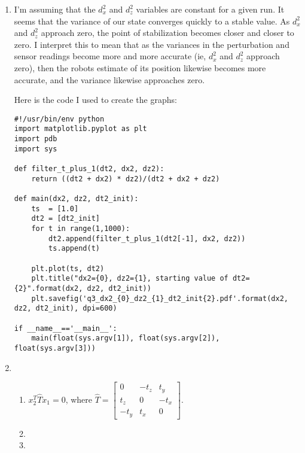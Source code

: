 \documentclass[letter,8pt]{article}
\begin{document}
\begin{enumerate}
\item I'm assuming that the $d_x^2$ and $d_z^2$ variables are constant for a given run.
  It seems that the variance of our state converges quickly to a stable value. As $d_x^2$ and $d_z^2$
  approach zero, the point of stabilization becomes closer and closer to zero. I interpret this to mean
  that as the variances in the perturbation and sensor readings become more and more accurate (ie, $d_x^2$ and $d_z^2$ approach zero),
  then the robots estimate of its position likewise becomes more accurate, and the variance likewise approaches zero.

  Here is the code I used to create the graphs:
  \begin{verbatim}
#!/usr/bin/env python
import matplotlib.pyplot as plt
import pdb
import sys

def filter_t_plus_1(dt2, dx2, dz2):
    return ((dt2 + dx2) * dz2)/(dt2 + dx2 + dz2)

def main(dx2, dz2, dt2_init):
    ts  = [1.0]
    dt2 = [dt2_init]
    for t in range(1,1000):
        dt2.append(filter_t_plus_1(dt2[-1], dx2, dz2))
        ts.append(t)

    plt.plot(ts, dt2)
    plt.title("dx2={0}, dz2={1}, starting value of dt2={2}".format(dx2, dz2, dt2_init))
    plt.savefig('q3_dx2_{0}_dz2_{1}_dt2_init{2}.pdf'.format(dx2, dz2, dt2_init), dpi=600)

if __name__=='__main__':
    main(float(sys.argv[1]), float(sys.argv[2]), float(sys.argv[3]))
  \end{verbatim}
\item 
  \begin{enumerate}[label=\alph*)]
  \item $x_2^T\hat{T}x_1 = 0$, where $ \hat{T} = \begin{bmatrix}
    0 & -t_z & t_y\\
    t_z & 0 & -t_x\\
    -t_y & t_x & 0
  \end{bmatrix} 
$.
  \item
  \item
  \end{enumerate}


\end{enumerate}
\end{document}

